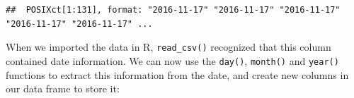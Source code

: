 \documentclass[]{book}
\newenvironment{Shaded}{\begin{snugshade}}{\end{snugshade}}
\newcommand{\KeywordTok}[1]{\textcolor[rgb]{0.13,0.29,0.53}{\textbf{#1}}}
\newcommand{\DataTypeTok}[1]{\textcolor[rgb]{0.13,0.29,0.53}{#1}}
\newcommand{\StringTok}[1]{\textcolor[rgb]{0.31,0.60,0.02}{#1}}
\newcommand{\OperatorTok}[1]{\textcolor[rgb]{0.81,0.36,0.00}{\textbf{#1}}}
\newcommand{\NormalTok}[1]{#1}
\begin{document}
\begin{Shaded}
\end{Shaded}

\begin{verbatim}
##  POSIXct[1:131], format: "2016-11-17" "2016-11-17" "2016-11-17" "2016-11-17" "2016-11-17" ...
\end{verbatim}

When we imported the data in R, \texttt{read\_csv()} recognized that
this column contained date information. We can now use the
\texttt{day()}, \texttt{month()} and \texttt{year()} functions to
extract this information from the date, and create new columns in our
data frame to store it:

\begin{Shaded}
\end{Shaded}
\end{document}
